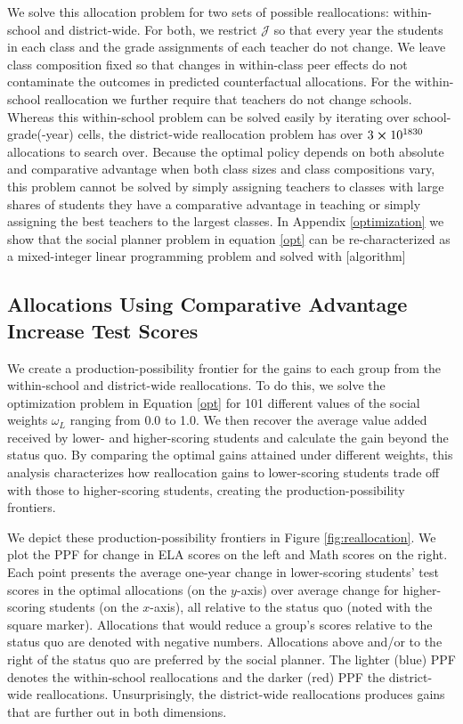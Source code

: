 \documentclass[12pt]{article}
\theoremstyle{definition}
\theoremstyle{definition}
\theoremstyle{definition}
\theoremstyle{definition}
\begin{document}
We solve this allocation problem for two sets of possible reallocations: within-school and district-wide. For both, we restrict $\mathscr{J}$ so that every year the students in each class and the grade assignments of each teacher do not change. We leave class composition fixed so that changes in within-class peer effects do not contaminate the outcomes in predicted counterfactual allocations. For the within-school reallocation we further require that teachers do not change schools.  Whereas this within-school problem can be solved easily by iterating over school-grade(-year) cells, the district-wide reallocation problem has over $3\cross 10^{1830}$ allocations to search over. Because the optimal policy depends on both absolute and comparative advantage when both class sizes and class compositions vary, this problem cannot be solved by simply assigning teachers to classes with large shares of students they have a comparative advantage in teaching or simply assigning the best teachers to the largest classes. In Appendix \ref{optimization} we show that the social planner problem in equation \ref{opt} can be re-characterized as a mixed-integer linear programming problem and solved with [algorithm] \citep{?}



\subsection{Allocations Using Comparative Advantage Increase Test Scores}

We create a production-possibility frontier for the gains to each group from the within-school and district-wide reallocations. To do this, we solve the optimization problem in Equation \ref{opt} for 101 different values of the social weights $\omega_L$ ranging from 0.0 to 1.0. We then recover the average value added received by lower- and higher-scoring students and calculate the gain beyond the status quo. By comparing the optimal gains attained under different weights, this analysis characterizes how reallocation gains to lower-scoring students trade off with those to higher-scoring students, creating the production-possibility frontiers.

We depict these production-possibility frontiers in Figure \ref{fig:reallocation}. We plot the PPF for change in  ELA scores on the left and Math scores on the right. Each point presents the average one-year change in lower-scoring students' test scores in the optimal allocations (on the $y$-axis) over average change for higher-scoring students (on the $x$-axis), all relative to the status quo (noted with the square marker). Allocations that would reduce a group's scores relative to the status quo are denoted with negative numbers. Allocations above and/or to the right of the status quo are preferred by the social planner. The lighter (blue) PPF denotes the within-school reallocations and the darker (red) PPF the district-wide reallocations. Unsurprisingly, the district-wide reallocations produces gains that are further out in both dimensions.
\end{document}
